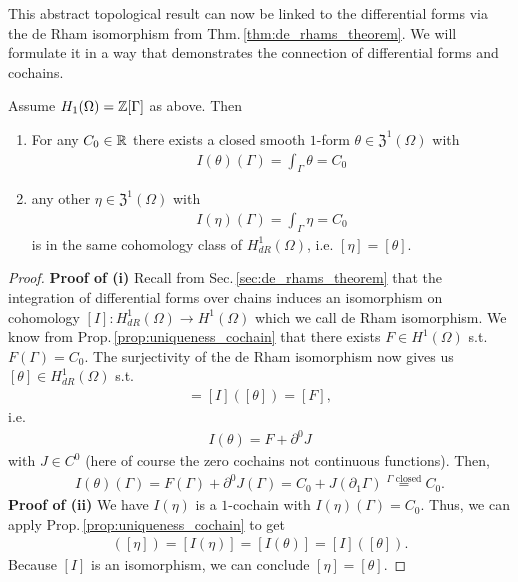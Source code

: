 \documentclass[../master_thesis.tex]{subfiles}
\begin{document}
This abstract topological result can now be linked to the differential 
forms via the de Rham isomorphism from Thm.\,\ref{thm:de_rhams_theorem}. 
We will formulate it in a way 
that demonstrates the connection of differential forms and cochains.
\begin{corollary}\label{cor:existence_uniqueness_1form}
    Assume $H_1(\Omega) = \mathbb{Z} [\Gamma]$ as above. Then
    \begin{enumerate}[\normalfont(i)]
        \item For any $C_0 \in \mathbb{R}$ there exists a closed smooth $1$-form 
            $\theta \in \mathfrak{Z}^1(\Omega)$ with 
            \begin{align*}
                I(\theta)(\Gamma) = \int_\Gamma \theta = C_0
            \end{align*}
        \item any other $\eta \in \mathfrak{Z}^1(\Omega)$ with 
            \begin{align*}
                I(\eta)(\Gamma) = \int_\Gamma \eta = C_0
            \end{align*}
            is in the same cohomology class of $H_{dR}^1(\Omega)$,
            i.e. $[\eta] = [\theta]$.
    \end{enumerate}
\end{corollary}

\begin{proof}
    \textbf{Proof of (i)}
    Recall from Sec.\,\ref{sec:de_rhams_theorem} 
    that the integration of differential forms 
    over chains induces an isomorphism on cohomology 
    $[I]: H_{dR}^1(\Omega) \rightarrow H^1(\Omega)$ which we call 
    de Rham isomorphism. We know from 
    Prop.\,\ref{prop:uniqueness_cochain} that there exists $F\in H^1(\Omega)$ 
    s.t. $F(\Gamma) = C_0$. The surjectivity of the de Rham isomorphism 
    now gives us $[\theta] \in H_{dR}^1(\Omega)$ s.t.
    \begin{align*}
        [I(\theta)] = [I]([\theta]) = [F],
    \end{align*}
    i.e.
    \begin{align*}
        I(\theta) = F + \partial^0 J
    \end{align*}
    with $J \in C^0$ (here of course the zero cochains not continuous functions). 
    Then, 
    \begin{align*}
        I(\theta)(\Gamma) = F(\Gamma) + \partial^0 J(\Gamma) 
        = C_0 + J(\partial_1 \Gamma) 
        \stackrel{\text{$\Gamma$ closed}}{=} C_0. 
    \end{align*}
    \textbf{Proof of (ii)}
    We have $I(\eta)$ is a $1$-cochain with $I(\eta)(\Gamma) = C_0$.
    Thus, we can apply Prop.\,\ref{prop:uniqueness_cochain} to get
    \begin{align*}
        [I]([\eta])=[I(\eta)] = [I(\theta)]=[I]([\theta]).
    \end{align*}
    Because $[I]$ is an isomorphism, we can conclude $[\eta] = [\theta]$.
\end{proof}
\end{document}
